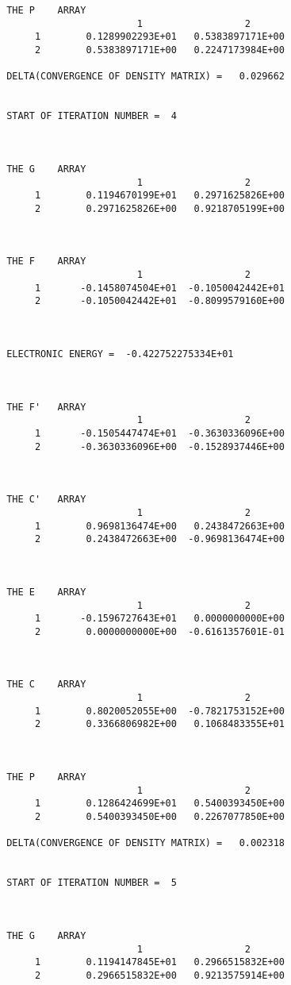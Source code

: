 \begin{verbatim}
 THE P    ARRAY
                        1                  2
      1        0.1289902293E+01   0.5383897171E+00
      2        0.5383897171E+00   0.2247173984E+00

 DELTA(CONVERGENCE OF DENSITY MATRIX) =   0.029662


 START OF ITERATION NUMBER =  4



 THE G    ARRAY
                        1                  2
      1        0.1194670199E+01   0.2971625826E+00
      2        0.2971625826E+00   0.9218705199E+00



 THE F    ARRAY
                        1                  2
      1       -0.1458074504E+01  -0.1050042442E+01
      2       -0.1050042442E+01  -0.8099579160E+00



 ELECTRONIC ENERGY =  -0.422752275334E+01



 THE F'   ARRAY
                        1                  2
      1       -0.1505447474E+01  -0.3630336096E+00
      2       -0.3630336096E+00  -0.1528937446E+00



 THE C'   ARRAY
                        1                  2
      1        0.9698136474E+00   0.2438472663E+00
      2        0.2438472663E+00  -0.9698136474E+00



 THE E    ARRAY
                        1                  2
      1       -0.1596727643E+01   0.0000000000E+00
      2        0.0000000000E+00  -0.6161357601E-01



 THE C    ARRAY
                        1                  2
      1        0.8020052055E+00  -0.7821753152E+00
      2        0.3366806982E+00   0.1068483355E+01



 THE P    ARRAY
                        1                  2
      1        0.1286424699E+01   0.5400393450E+00
      2        0.5400393450E+00   0.2267077850E+00

 DELTA(CONVERGENCE OF DENSITY MATRIX) =   0.002318


 START OF ITERATION NUMBER =  5



 THE G    ARRAY
                        1                  2
      1        0.1194147845E+01   0.2966515832E+00
      2        0.2966515832E+00   0.9213575914E+00




\end{verbatim}
